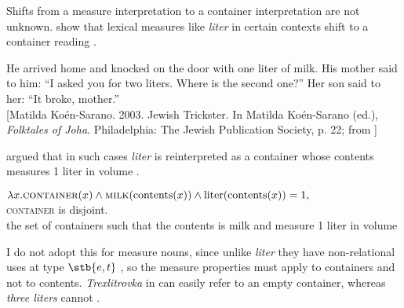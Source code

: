 \documentclass[output=paper]{langscibook}
\begin{document}
\noindent Shifts from a measure interpretation to a container interpretation are not unknown. \citet{Khrizman.etal2015} show that lexical measures like \textit{liter} in certain contexts shift to a container reading .

\ea\label{ex:khrizmann:24} He arrived home and knocked on the door with one liter of milk. His mother said to him: ``I asked you for two liters. Where is the second one?'' Her son said to her: ``It broke, mother.'' \\
{[Matilda Koén-Sarano. 2003. Jewish Trickster. In Matilda Koén-Sarano (ed.), \textit{Folktales of Joha}. Philadelphia: The Jewish Publication Society, p. 22; from \citealt[200]{Khrizman.etal2015}]}
\z

\noindent \citet{Khrizman.etal2015} argued that in such cases \textit{liter} is reinterpreted as a container whose contents measures 1 liter in volume .

\ea\label{ex:khrizmann:25} $\lambda x. \textsc{container}(x) \wedge \textsc{milk}(\textnormal{contents}(x)) \wedge \textnormal{liter}(\textnormal{contents}(x)) = 1,$\\
{\textsc{container} is disjoint.\\
the set of containers such that the contents is milk and measure 1 liter in volume}
\z

\noindent I do not adopt this for measure nouns, since unlike \textit{liter} they have non-relational uses at type $\stb{e,t}$ , so the measure properties must apply to containers and not to contents. \textit{Trexlitrovka} in  can easily refer to an empty container, whereas \textit{three liters} cannot .

\ea\label{ex:khrizmann:26}
\z\z
\end{document}
